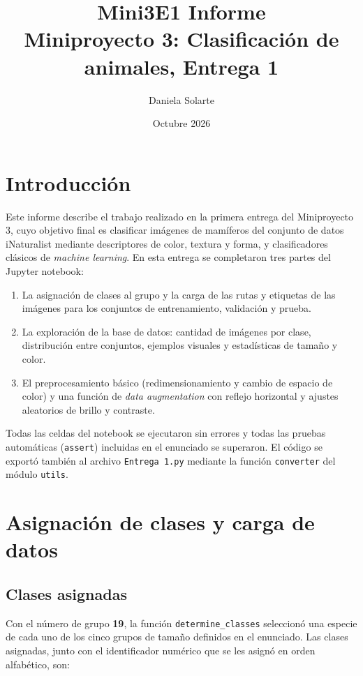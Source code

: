 \documentclass[11pt]{article}
\title{Mini3E1 Informe\\[0.3em]\large Miniproyecto 3: Clasificación de animales, Entrega 1}
\author{Daniela Solarte}
\date{Octubre 2026}
\begin{document}
\maketitle

\section{Introducción}

Este informe describe el trabajo realizado en la primera entrega del Miniproyecto 3, cuyo objetivo final es clasificar imágenes de mamíferos del conjunto de datos iNaturalist mediante descriptores de color, textura y forma, y clasificadores clásicos de \emph{machine learning}. En esta entrega se completaron tres partes del Jupyter notebook:

\begin{enumerate}
  \item La asignación de clases al grupo y la carga de las rutas y etiquetas de las imágenes para los conjuntos de entrenamiento, validación y prueba.
  \item La exploración de la base de datos: cantidad de imágenes por clase, distribución entre conjuntos, ejemplos visuales y estadísticas de tamaño y color.
  \item El preprocesamiento básico (redimensionamiento y cambio de espacio de color) y una función de \emph{data augmentation} con reflejo horizontal y ajustes aleatorios de brillo y contraste.
\end{enumerate}

Todas las celdas del notebook se ejecutaron sin errores y todas las pruebas automáticas (\texttt{assert}) incluidas en el enunciado se superaron. El código se exportó también al archivo \texttt{Entrega 1.py} mediante la función \texttt{converter} del módulo \texttt{utils}.

\section{Asignación de clases y carga de datos}

\subsection{Clases asignadas}

Con el número de grupo \textbf{19}, la función \texttt{determine\_classes} seleccionó una especie de cada uno de los cinco grupos de tamaño definidos en el enunciado. Las clases asignadas, junto con el identificador numérico que se les asignó en orden alfabético, son:
\end{document}
